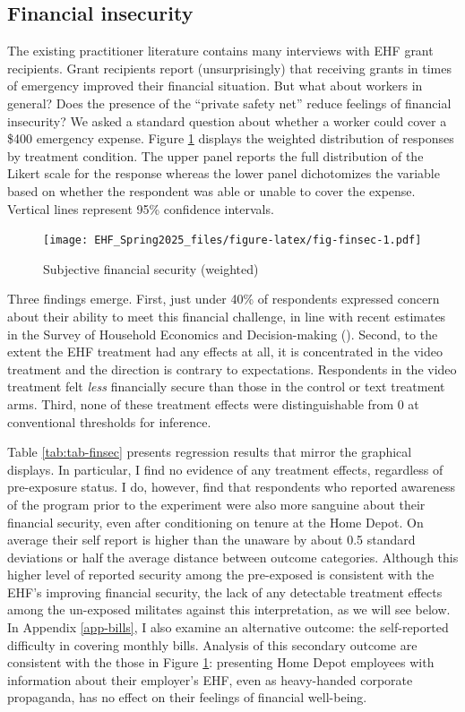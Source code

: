 \documentclass[
  11pt,
  oneside]{article}
\begin{document}
\subsection{Financial insecurity}\label{financial-insecurity}

The existing practitioner literature contains many interviews with EHF grant recipients. Grant recipients report (unsurprisingly) that receiving grants in times of emergency improved their financial situation. But what about workers in general? Does the presence of the ``private safety net'' reduce feelings of financial insecurity? We asked a standard question about whether a worker could cover a \$400 emergency expense. Figure \ref{fig:fig-finsec} displays the weighted distribution of responses by treatment condition. The upper panel reports the full distribution of the Likert scale for the response whereas the lower panel dichotomizes the variable based on whether the respondent was able or unable to cover the expense. Vertical lines represent 95\% confidence intervals.

\begin{figure}
\centering
\texttt{[image: EHF\_Spring2025\_files/figure-latex/fig-finsec-1.pdf]}
\caption{\label{fig:fig-finsec}Subjective financial security (weighted)}
\end{figure}

Three findings emerge. First, just under 40\% of respondents expressed concern about their ability to meet this financial challenge, in line with recent estimates in the Survey of Household Economics and Decision-making (). Second, to the extent the EHF treatment had any effects at all, it is concentrated in the video treatment and the direction is contrary to expectations. Respondents in the video treatment felt \emph{less} financially secure than those in the control or text treatment arms. Third, none of these treatment effects were distinguishable from 0 at conventional thresholds for inference.

Table \ref{tab:tab-finsec} presents regression results that mirror the graphical displays. In particular, I find no evidence of any treatment effects, regardless of pre-exposure status. I do, however, find that respondents who reported awareness of the program prior to the experiment were also more sanguine about their financial security, even after conditioning on tenure at the Home Depot. On average their self report is higher than the unaware by about 0.5 standard deviations or half the average distance between outcome categories. Although this higher level of reported security among the pre-exposed is consistent with the EHF's improving financial security, the lack of any detectable treatment effects among the un-exposed militates against this interpretation, as we will see below. In Appendix \ref{app-bills}, I also examine an alternative outcome: the self-reported difficulty in covering monthly bills. Analysis of this secondary outcome are consistent with the those in Figure \ref{fig:fig-finsec}: presenting Home Depot employees with information about their employer's EHF, even as heavy-handed corporate propaganda, has no effect on their feelings of financial well-being.
\end{document}
